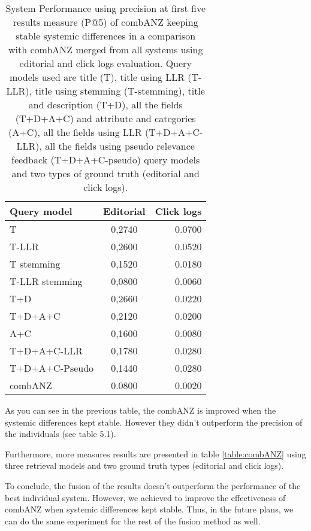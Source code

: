 \begin{table}[H]
\begin{center}
\footnotesize
\caption{System Performance using precision at first five results measure (P@5) of combANZ keeping stable systemic differences in a comparison with combANZ merged from all systems using editorial and click logs evaluation. Query models used are title (T), title using LLR (T-LLR), title using stemming (T-stemming), title and description (T+D), all the fields (T+D+A+C) and attribute and categories (A+C), all the fields using LLR (T+D+A+C-LLR), all the fields using pseudo relevance feedback (T+D+A+C-pseudo) query models and two types of ground truth (editorial and click logs).
}
\begin{tabular}{lcr}
\midrule
 Query model & Editorial & Click logs \\
 \midrule
	T & 0,2740 & 0.0700 \\
	T-LLR & 0,2600 & 0.0520 \\
	T stemming & 0,1520 & 0.0180 \\
	T-LLR stemming & 0,0800 & 0.0060 \\
	T+D & 0,2660 & 0.0220 \\
	T+D+A+C & 0,2120 & 0.0200 \\
	A+C & 0,1600 & 0.0080 \\
	T+D+A+C-LLR & 0,1780 & 0.0280 \\
	T+D+A+C-Pseudo & 0,1440 & 0.0280 \\
	\midrule
	combANZ & 0.0800 & 0.0020 \\
\bottomrule
\end{tabular}
\end{center}
\end{table}



As you can see in the previous table, the combANZ is improved when the systemic differences kept stable. However they didn't outperform the precision of the individuals (see table 5.1).


Furthermore, more measures results are presented in table \ref{table:combANZ} using three retrieval models and two ground truth types (editorial and click logs).

To conclude, the fusion of the results doesn't outperform the performance of the best individual system. However, we achieved to improve the effectiveness of combANZ when systemic differences kept stable. Thus, in the future plans, we can do the same experiment for the rest of the fusion method as well.

